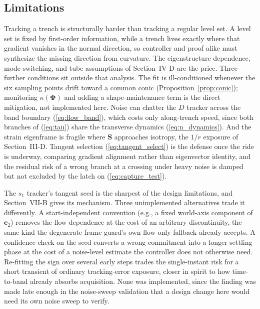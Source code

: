 \documentclass[lettersize,journal]{IEEEtran}
\begin{document}
\subsection{Limitations}
\label{sec:limitations}

Tracking a trench is structurally harder than tracking a regular level
set. A level set is fixed by first-order information, while a trench
lives exactly where that gradient vanishes in the normal direction, so
controller and proof alike must synthesize the missing direction from
curvature. The eigenstructure dependence, mode switching, and tube
assumptions of Section~\mbox{IV-D} are the price. Three further
conditions sit outside that analysis. The fit is ill-conditioned
whenever the six sampling points drift toward a common conic
(Proposition~\ref{prop:conic}); monitoring $\kappa(\boldsymbol{\Phi})$
and adding a shape-maintenance term is the direct mitigation, not
implemented here. Noise can chatter the $D$ tracker across the band
boundary (\ref{eq:flow_band}), which costs only along-trench speed,
since both branches of (\ref{eq:tau}) share the transverse dynamics
(\ref{eq:n_dynamics}). And the strain eigenframe is fragile where
$\mathbf{S}$ approaches isotropy, the $1/r$ exposure of
Section~\mbox{III-D}. Tangent selection (\ref{eq:tangent_select}) is
the defense once the ride is underway, comparing gradient alignment
rather than eigenvector identity, and the residual risk of a wrong
branch at a crossing under heavy noise is damped but not excluded by
the latch on (\ref{eq:capture_test}).

The $s_1$ tracker's tangent seed is the sharpest of the design
limitations, and Section~\mbox{VII-B} gives its mechanism. Three
unimplemented alternatives trade it differently. A start-independent
convention (e.g., a fixed world-axis component of $\mathbf{e}_2$)
removes the flow dependence at the cost of an arbitrary discontinuity,
the same kind the degenerate-frame guard's own flow-only fallback
already accepts. A confidence check on the seed converts a wrong
commitment into a longer settling phase at the cost of a noise-level
estimate the controller does not otherwise need. Re-fitting the sign
over several early steps trades the single-instant risk for a short
transient of ordinary tracking-error exposure, closer in spirit to how
time-to-band already absorbs acquisition. None was implemented, since
the finding was made late enough in the noise-sweep validation that a
design change here would need its own noise sweep to verify.
\end{document}
